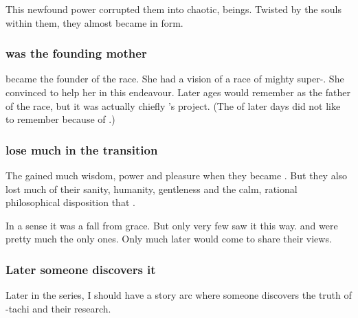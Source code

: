 
This newfound power corrupted them into chaotic, \daemonic{} beings. Twisted by the \xzaishannic{} souls within them, they almost became \xzaishanns{} in \ophidian{} form. 





\subsubsection{\Tiamat was the founding mother}
\Tiamat became the founder of the \draconian race.
She had a vision of a race of mighty super-\ophidians.
She convinced \Sethicus to help her in this endeavour.
Later ages would remember \Sethicus as the father of the \draconian race, but it was actually chiefly \Tiamat's project.
(The \dragons of later days did not like to remember \Tiamat because of .)





\subsubsection{\Dragons lose much in the transition}
The \dragons gained much wisdom, power and pleasure when they became \dragons. 
But they also lost much of their sanity, humanity, gentleness and the calm, rational philosophical disposition that . 

In a sense it was a fall from grace. 
But only very few \dragons saw it this way. 
\Iurzmacul and \Nexagglachel were pretty much the only ones. 
Only much later would \Ishnaruchaefir come to share their views.





\subsubsection{Later someone discovers it}
Later in the series, I should have a story arc where someone discovers the truth of \Sethicus-tachi and their research. 

